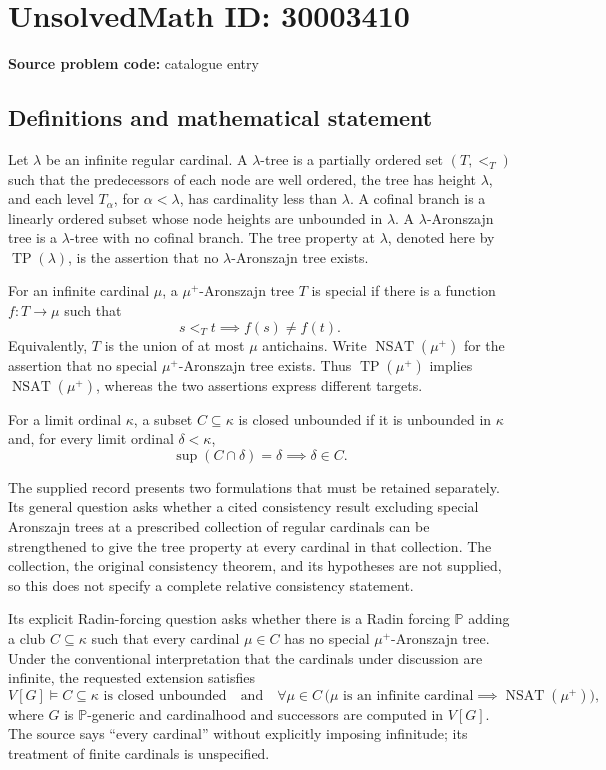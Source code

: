 \documentclass[11pt]{article}
\begin{document}
\section*{UnsolvedMath ID: 30003410}
\textbf{Source problem code:} catalogue entry
\subsection{Definitions and mathematical statement}
Let \(\lambda\) be an infinite regular cardinal. A \(\lambda\)-tree is a partially ordered set \((T,<_{T})\) such that the predecessors of each node are well ordered, the tree has height \(\lambda\), and each level \(T_\alpha\), for \(\alpha<\lambda\), has cardinality less than \(\lambda\). A cofinal branch is a linearly ordered subset whose node heights are unbounded in \(\lambda\). A \(\lambda\)-Aronszajn tree is a \(\lambda\)-tree with no cofinal branch. The tree property at \(\lambda\), denoted here by \(\operatorname{TP}(\lambda)\), is the assertion that no \(\lambda\)-Aronszajn tree exists.

For an infinite cardinal \(\mu\), a \(\mu^{+}\)-Aronszajn tree \(T\) is special if there is a function \(f:T\to\mu\) such that
\[
 s<_{T}t\implies f(s)\ne f(t).
\]
Equivalently, \(T\) is the union of at most \(\mu\) antichains. Write \(\operatorname{NSAT}(\mu^{+})\) for the assertion that no special \(\mu^{+}\)-Aronszajn tree exists. Thus \(\operatorname{TP}(\mu^{+})\) implies \(\operatorname{NSAT}(\mu^{+})\), whereas the two assertions express different targets.

For a limit ordinal \(\kappa\), a subset \(C\subseteq\kappa\) is closed unbounded if it is unbounded in \(\kappa\) and, for every limit ordinal \(\delta<\kappa\),
\[
 \sup(C\cap\delta)=\delta\implies\delta\in C.
\]

The supplied record presents two formulations that must be retained separately. Its general question asks whether a cited consistency result excluding special Aronszajn trees at a prescribed collection of regular cardinals can be strengthened to give the tree property at every cardinal in that collection. The collection, the original consistency theorem, and its hypotheses are not supplied, so this does not specify a complete relative consistency statement.

Its explicit Radin-forcing question asks whether there is a Radin forcing \(\mathbb P\) adding a club \(C\subseteq\kappa\) such that every cardinal \(\mu\in C\) has no special \(\mu^{+}\)-Aronszajn tree. Under the conventional interpretation that the cardinals under discussion are infinite, the requested extension satisfies
\[
 V[G]\models
 \text{\(C\subseteq\kappa\) is closed unbounded}
 \quad\text{and}\quad
 \forall\mu\in C\,
 \bigl(\mu\text{ is an infinite cardinal}
       \implies\operatorname{NSAT}(\mu^{+})\bigr),
\]
where \(G\) is \(\mathbb P\)-generic and cardinalhood and successors are computed in \(V[G]\). The source says ``every cardinal'' without explicitly imposing infinitude; its treatment of finite cardinals is unspecified.
\end{document}
